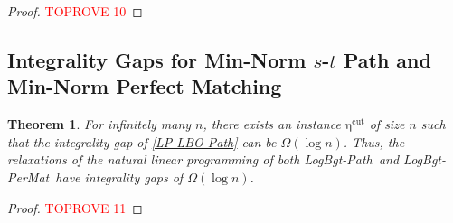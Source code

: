 \documentclass[11pt,a4paper]{article} \usepackage{enumitem}
\newcommand{\LBOmatch}{\textsf{LogBgt-PerMat}}
\newcommand{\LBOpath}{\textsf{LogBgt-Path}}
\newcommand{\cuteta}{\operatorname{\eta^{cut}}}
\newtheorem{theorem}{Theorem}[section]
\theoremstyle{definition}
\begin{document}
\begin{proof}\textcolor{red}{TOPROVE 10}\end{proof}



\subsection{Integrality Gaps for Min-Norm $s$-$t$ Path and Min-Norm Perfect Matching}  \label{sec:integralgap-2}

\begin{theorem} \label{thm:intgap-1}
For infinitely many $n$, there exists an instance $\cuteta$ of size $n$ such that the integrality gap of \cref{LP-LBO-Path} can be $\Omega(\log n)$.
    Thus, the relaxations of the natural linear programming of both \LBOpath\ and \LBOmatch\ have integrality gaps of $\Omega(\log n)$.
\end{theorem}

\begin{proof}\textcolor{red}{TOPROVE 11}\end{proof}
\end{document}
